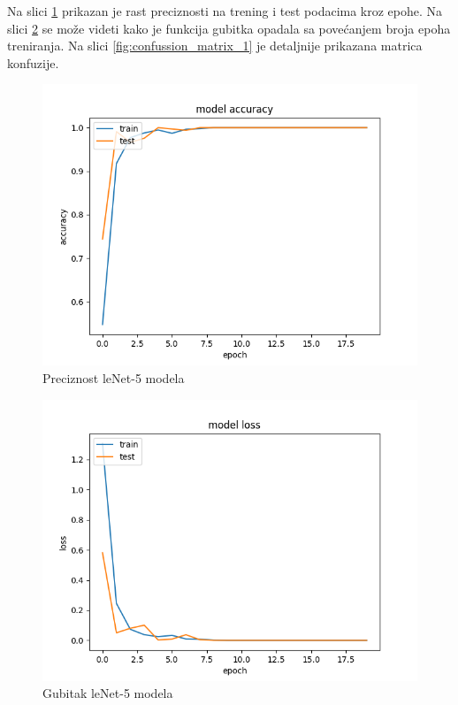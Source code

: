 \documentclass[a4paper]{article}
\begin{document}
Na slici \ref{fig:accuracy_1} prikazan je rast preciznosti na trening i test podacima kroz epohe. Na slici \ref{fig:loss_1} se može videti kako je funkcija gubitka opadala sa povećanjem broja epoha treniranja. Na slici \ref{fig:confussion_matrix_1} je detaljnije prikazana matrica konfuzije.

\begin{figure}[h!]
\begin{center}
\includegraphics[scale=0.34]{accuracy_1.png}
\end{center}
\caption{Preciznost leNet-5 modela}
\label{fig:accuracy_1}
\end{figure}

\begin{figure}[h!]
\begin{center}
\includegraphics[scale=0.34]{loss_1.png}
\end{center}
\caption{Gubitak leNet-5 modela}
\label{fig:loss_1}
\end{figure}
\end{document}
